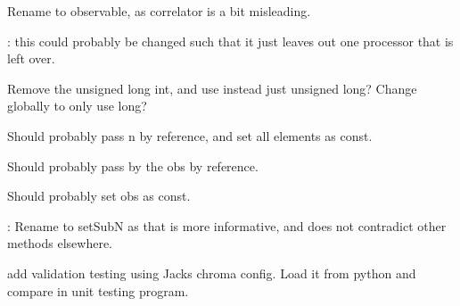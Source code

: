 
\begin{DoxyRefList}
\item[Class \mbox{\hyperlink{class_correlator}{Correlator}} ]\label{todo__todo000004}%
%
Rename to observable, as correlator is a bit misleading. 
\item[Global \mbox{\hyperlink{class_parallel_1_1_communicator_acd7e2f114728e5207093743a58ab3a40}{Parallel::Communicator::check\+Processor\+Validity}} ()]\label{todo__todo000007}%
%
\+: this could probably be changed such that it just leaves out one processor that is left over.  
\item[Global \mbox{\hyperlink{class_parallel_1_1_communicator_ae5739683ff54a7c39af6e37920e70ea5}{Parallel::Communicator::gather\+Double\+Results}} (double $\ast$data, unsigned int N)]\label{todo__todo000008}%
%
Remove the unsigned long int, and use instead just unsigned long? Change globally to only use long?  
\item[Global \mbox{\hyperlink{class_parallel_1_1_communicator_a1c598fae96e05e3b36db368e60453d63}{Parallel::Communicator::get\+Neighbours\+Neighbour\+Negative\+Link}} (\mbox{\hyperlink{class_lattice}{Lattice$<$ S\+U3 $>$}} $\ast$lattice, std\+::vector$<$ int $>$ n, int mu, int $\ast$mu\+Index, int nu, int $\ast$nu\+Index, int S\+U3\+Dir)]\label{todo__todo000005}%
%
Should probably pass n by reference, and set all elements as const.  
\item[Global \mbox{\hyperlink{class_parallel_1_1_communicator_a5d42989e7a3022de6042e3503aa35346}{Parallel::Communicator::reduce\+To\+Temporal\+Dimension}} (std\+::vector$<$ double $>$ \&obs\+Results, std\+::vector$<$ double $>$ obs)]\label{todo__todo000006}%
%
Should probably pass by the obs by reference. 

Should probably set obs as const.  
\item[Global \mbox{\hyperlink{class_parallel_1_1_index_acbf43868aa2efc7ecf63b5b490fc00a0}{Parallel::Index::setN}} (std\+::vector$<$ unsigned int $>$ N)]\label{todo__todo000009}%
%
\+: Rename to set\+SubN as that is more informative, and does not contradict other methods elsewhere.  
\item[Global \mbox{\hyperlink{test_8h_a91a9c7ea8af27bb3962f1207dd4cb8fd}{run\+Unit\+Tests}} (bool run\+Tests)]\label{todo__todo000010}%
%
add validation testing using Jacks chroma config. Load it from python and compare in unit testing program. 


\end{DoxyRefList}
